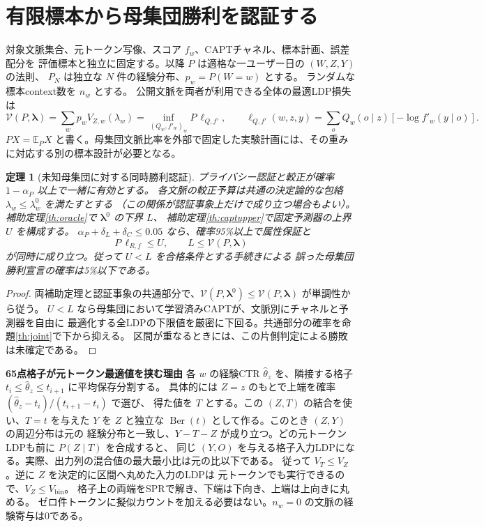 \documentclass[a4paper,11pt]{ltjsarticle}
\theoremstyle{jp}
\newtheorem{thm}{定理}
\newcommand{\E}{\mathbb E}
\newcommand{\Ber}{\operatorname{Ber}}
\newcommand{\para}[1]{\par\Needspace{3\baselineskip}\addvspace{.6\baselineskip}\noindent\textbf{#1}\enspace}
\begin{document}
\section{有限標本から母集団勝利を認証する}

対象文脈集合、元トークン写像、スコア \(f_w\)、CAPTチャネル、標本計画、誤差配分を
評価標本と独立に固定する。以降 \(P\) は適格な一ユーザー日の \((W,Z,Y)\) の法則、
\(P_N\) は独立な \(N\) 件の経験分布、\(p_w=P(W=w)\) とする。
ランダムな標本context数を \(n_w\) とする。
公開文脈を両者が利用できる全体の最適LDP損失は
\[
 \mathcal V(P,\boldsymbol\lambda)=\sum_w p_w V_{Z,w}(\lambda_w)
 =\inf_{(Q_w,f'_w)_w}P\,\ell_{Q,f'},\qquad
 \ell_{Q,f'}(w,z,y)=\sum_o Q_w(o\mid z)[-\log f'_w(y\mid o)] .
\]
\(P X=\E_P X\) と書く。母集団文脈比率を外部で固定した実験計画には、その重みに対応する別の標本設計が必要となる。

\begin{thm}[未知母集団に対する同時勝利認証]\label{th:population}
プライバシー認証と較正が確率 \(1-\alpha_P\) 以上で一緒に有効とする。
各文脈の較正予算は共通の決定論的な包絡 \(\lambda_w\le\lambda^0_w\) を満たすとする
（この関係が認証事象上だけで成り立つ場合もよい）。
補助定理\ref{th:oracle}で \(\boldsymbol\lambda^0\) の下界 \(L\)、
補助定理\ref{th:captupper}で固定予測器の上界 \(U\) を構成する。
\(\alpha_P+\delta_L+\delta_C\le0.05\) なら、確率95\%以上で属性保証と
\[
 P\,\ell_{R,f}\le U,\qquad L\le\mathcal V(P,\boldsymbol\lambda)
\]
が同時に成り立つ。従って \(U<L\) を合格条件とする手続きによる
誤った母集団勝利宣言の確率は5\%以下である。
\end{thm}
\begin{proof}
両補助定理と認証事象の共通部分で、\(\mathcal V(P,\boldsymbol\lambda^0)
\le\mathcal V(P,\boldsymbol\lambda)\) が単調性から従う。
\(U<L\) なら母集団において学習済みCAPTが、文脈別にチャネルと予測器を自由に
最適化する全LDPの下限値を厳密に下回る。共通部分の確率を命題\ref{th:joint}で下から抑える。
区間が重なるときには、この片側判定による勝敗は未確定である。
\end{proof}

\para{65点格子が元トークン最適値を挟む理由}
各 \(w\) の経験CTR \(\hat\theta_z\) を、隣接する格子
\(t_i\le\hat\theta_z\le t_{i+1}\) に平均保存分割する。
具体的には \(Z=z\) のもとで上端を確率 \((\hat\theta_z-t_i)/(t_{i+1}-t_i)\) で選び、
得た値を \(T\) とする。この \((Z,T)\) の結合を使い、\(T=t\) を与えた
\(Y\) を \(Z\) と独立な \(\Ber(t)\) として作る。このとき \((Z,Y)\) の周辺分布は元の
経験分布と一致し、\(Y-T-Z\) が成り立つ。どの元トークンLDPも前に \(P(Z\mid T)\) を合成すると、
同じ \((Y,O)\) を与える格子入力LDPになる。実際、出力列の混合値の最大最小比は元の比以下である。
従って \(V_T\le V_Z\)。逆に \(Z\) を決定的に区間へ丸めた入力のLDPは
元トークンでも実行できるので、\(V_Z\le V_{\mathrm{bin}}\)。
格子上の両端をSPRで解き、下端は下向き、上端は上向きに丸める。
ゼロ件トークンに擬似カウントを加える必要はない。\(n_w=0\) の文脈の経験寄与は0である。
\end{document}
